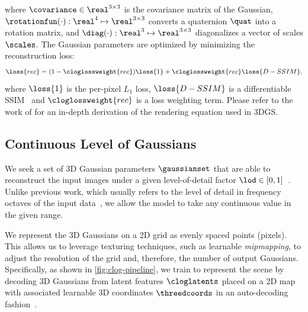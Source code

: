     where $\covariance \in \real^{3{\times}3}$ is the covariance matrix of the Gaussian,
    $\rotationfun(\cdot): \real^4 \mapsto \real^{3{\times}3}$ converts a quaternion $\quat$ into a rotation matrix, and $\diag(\cdot): \real^3\mapsto\real^{3{\times}3}$ diagonalizes a vector of scales $\scales$.
    The Gaussian parameters are optimized by minimizing the reconstruction loss:
    \begin{equation}
      \loss{rec} = (1 - \cloglossweight{rec}) \loss{1} + \cloglossweight{rec} \loss{D-SSIM},
      \label{eq:clog-reconloss}
    \end{equation}
    where $\loss{1}$ is the per-pixel $L_1$ loss, $\loss{D-SSIM}$ is a differentiable SSIM~\cite{kerbl20233d}
    and $\cloglossweight{rec}$ is a loss weighting term.
    Please refer to the work of \citet{kerbl20233d} for an in-depth derivation of
    the rendering equation used in 3DGS.

  \subsection{Continuous Level of Gaussians}
    \label{sec:clog-pipeline}

    We seek a set of 3D Gaussian parameters $\gaussianset$ that are able to
    reconstruct the input images under a given level-of-detail factor $\lod \in
      [0,1]$~\cite{takikawa2021neural}.
    Unlike previous work, which usually refers to the level of detail in frequency
    octaves of the input data~\cite{seo2024flod,ren2024octree}, we allow the model
    to take any continuous value in the given range.

    We represent the 3D Gaussians on a 2D grid as evenly spaced points (pixels).
    This allows us to leverage texturing techniques, such as learnable
    \textit{mipmapping}, to adjust the resolution of the grid and, therefore,
    the number of output Gaussians.
    Specifically, as shown in \cref{fig:clog-pipeline}, we train \clog to
    represent the scene by decoding 3D Gaussians from latent features
    $\cloglatents$ placed on a 2D map with associated learnable 3D coordinates
    $\threedcoords$ in an auto-decoding
    fashion~\cite{bojanowski2017otpimizing}.

